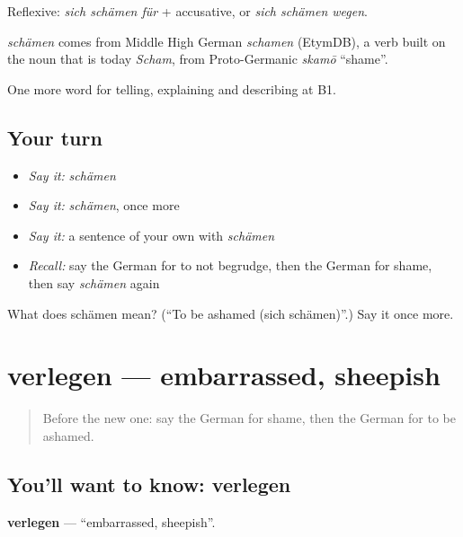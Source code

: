 Reflexive: \emph{sich schämen für} + accusative, or \emph{sich schämen wegen}.

\begin{cousinweb}
\emph{schämen} comes from Middle High German \emph{schamen} (EtymDB), a verb built on the noun that is today \emph{Scham}, from Proto-Germanic \emph{skamō} \textquotedblleft{}shame\textquotedblright{}.
\end{cousinweb}

\begin{grammarlens}[title={What you've built}]
One more word for telling, explaining and describing at B1.
\end{grammarlens}

\subsection*{Your turn}
\begin{itemize}
\raggedright
  \item \emph{Say it:} \emph{schämen}
  \item \emph{Say it:} \emph{schämen}, once more
  \item \emph{Say it:} a sentence of your own with \emph{schämen}
  \item \emph{Recall:} say the German for to not begrudge, then the German for shame, then say \emph{schämen} again
\end{itemize}

\begin{tcolorbox}[breakable,colback=teal!4,colframe=teal!35!black,title={Before you move on}]
What does schämen mean? (\textquotedblleft{}To be ashamed (sich schämen)\textquotedblright{}.) Say it once more.
\end{tcolorbox}
\section[verlegen]{verlegen — embarrassed, sheepish}

\label{lesson:GE-C467-verlegen}



\begin{quote}
Before the new one: say the German for shame, then the German for to be ashamed.
\end{quote}

\subsection*{You'll want to know: verlegen}
\textbf{verlegen} — \textquotedblleft{}embarrassed, sheepish\textquotedblright{}.

